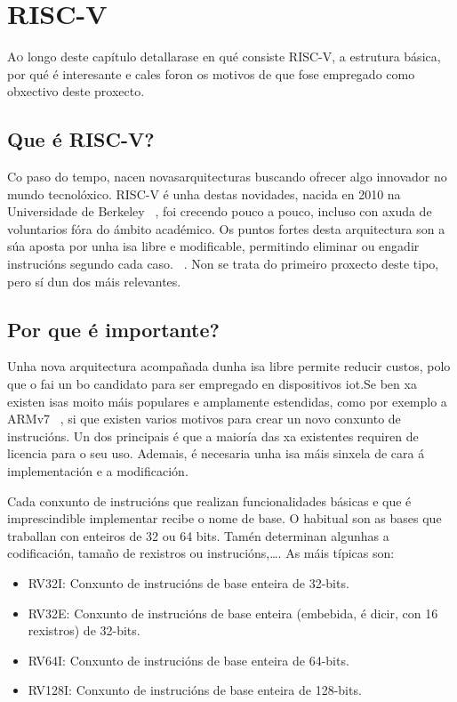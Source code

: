 \chapter{RISC-V}
\label{chap:riscv}

\lettrine{A}{o} longo deste capítulo detallarase en qué consiste RISC-V, a estrutura básica, por qué é interesante e cales foron os motivos de que fose empregado como obxectivo deste proxecto.

\section{Que é RISC-V?}\label{sec:que_riscv}
Co paso do tempo, nacen novasarquitecturas buscando ofrecer algo innovador no mundo tecnolóxico. RISC-V é unha destas novidades, nacida en 2010 na Universidade de Berkeley ~\cite{WikipediaRISCV}, foi crecendo pouco a pouco, incluso con axuda de voluntarios fóra do ámbito académico. Os puntos fortes desta arquitectura son a súa aposta por unha \acrfull{isa} libre e modificable, permitindo eliminar ou engadir instrucións segundo cada caso. ~\cite{RISCV_IoT}. Non se trata do primeiro proxecto deste tipo, pero sí dun dos máis relevantes. 

\section{Por que é importante?}\label{sec:imp_riscv}
Unha nova arquitectura acompañada dunha \acrshort{isa} libre permite reducir custos, polo que o fai un bo candidato para ser empregado en dispositivos \acrshort{iot}.Se ben xa existen \acrshort{isa}s moito máis populares e amplamente estendidas, como por exemplo a ARMv7 ~\cite{Waterman:EECS-2016-1}, si que existen varios motivos para crear un novo conxunto de instrucións. Un dos principais é que a maioría das xa existentes requiren de licencia para o seu uso. Ademais, é necesaria unha \acrshort{isa} máis sinxela de cara á implementación e a modificación. 

Cada conxunto de instrucións que realizan funcionalidades básicas e que é imprescindible implementar recibe o nome de base. O habitual son as bases que traballan con enteiros de 32 ou 64 bits. Tamén determinan algunhas a codificación, tamaño de rexistros ou instrucións,\dots. As máis típicas son: 
\begin{itemize}
    \item RV32I: Conxunto de instrucións de base enteira de 32-bits.
    \item RV32E: Conxunto de instrucións de base enteira (embebida, é dicir, con 16 rexistros) de 32-bits.
    \item RV64I: Conxunto de instrucións de base enteira de 64-bits.
    \item RV128I: Conxunto de instrucións de base enteira de 128-bits.
\end{itemize}

